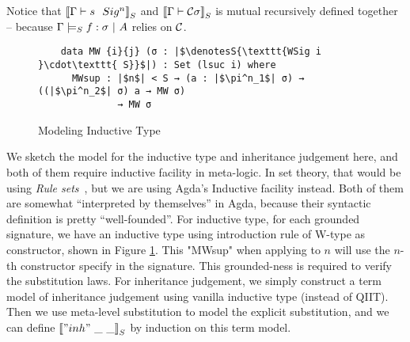Notice that $\denotesS{\goodSig{\Gamma}{s}{n}}$ and $\denotesS{\goodType{\Gamma}{\cC\sigma}{i}}$ is mutual recursively defined together -- because $\goodSealS{\Gamma}{f}{\sigma}{A}$ relies on $\cC$. 

\begin{figure}
  \centering
\begin{minipage}{0.8\linewidth}
  \begin{verbatim}
    data MW {i}{j} (σ : |$\denotesS{\texttt{WSig i }\cdot\texttt{ S}}$|) : Set (lsuc i) where
      MWsup : |$n$| < S → (a : |$\pi^n_1$| σ) → ((|$\pi^n_2$| σ) a → MW σ) 
              → MW σ
      \end{verbatim}
\end{minipage}
\caption{Modeling Inductive Type}\label{fig:model-ind-type}
\end{figure}

We sketch the model for the inductive type and inheritance judgement here, and both of them require inductive facility in meta-logic. In set theory, that would be using \textit{Rule sets}~\citep{timany2017consistency,aczel1998relating}, but we are using Agda's Inductive facility instead. Both of them are somewhat ``interpreted by themselves'' in Agda, because their syntactic definition is pretty ``well-founded''. For inductive type, for each grounded signature, we have an inductive type using introduction rule of W-type as constructor, shown in Figure \ref*{fig:model-ind-type}. This "MWsup" when applying to $n$ will use the $n$-th constructor specify in the signature. This grounded-ness is required to verify the substitution laws. For inheritance judgement, we simply construct a term model of inheritance judgement using vanilla inductive type (instead of QIIT). Then we use meta-level substitution to model the explicit substitution, and we can define $\denotesS{"inh"~\_ ~\_}$ by induction on this term model. 



